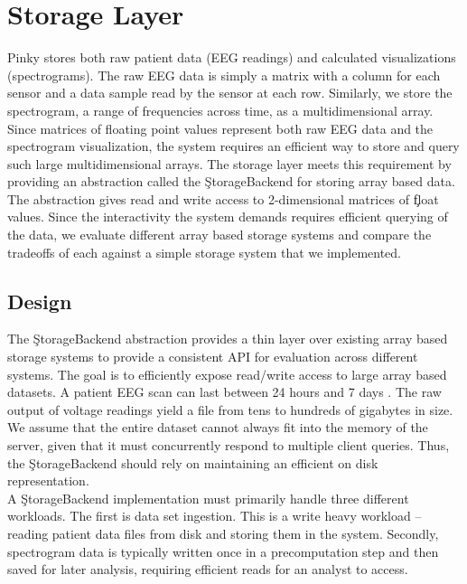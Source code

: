 \chapter{Storage Layer}\label{storage-ch}

Pinky stores both raw patient data (EEG readings) and calculated visualizations
(spectrograms). The raw EEG data is simply a matrix with a column for each
sensor and a data sample read by the sensor at each row. Similarly, we store
the spectrogram, a range of frequencies across time, as a multidimensional
array. Since matrices of floating point values represent both raw EEG data and
the spectrogram visualization, the system requires an efficient way to store
and query such large multidimensional arrays. The storage layer meets this
requirement by providing an abstraction called the \c{StorageBackend} for
storing array based data. The abstraction gives read and write access to
2-dimensional matrices of \c{float} values. Since the interactivity the system
demands requires efficient querying of the data, we evaluate different array
based storage systems and compare the tradeoffs of each against a simple
storage system that we implemented.


\section{Design}

The \c{StorageBackend} abstraction provides a thin layer over existing array
based storage systems to provide a consistent API for evaluation across
different systems. The goal is to efficiently expose read/write access to large
array based datasets. A patient EEG scan can last between 24 hours and 7 days
\cite{ceeg-3}. The raw output of voltage readings yield a file from tens to
hundreds of gigabytes in size. We assume that the entire dataset cannot always
fit into the memory of the server, given that it must concurrently respond to
multiple client queries. Thus, the \c{StorageBackend} should rely on
maintaining an efficient on disk representation. \\

A \c{StorageBackend} implementation must primarily handle three different
workloads. The first is data set ingestion. This is a write heavy workload --
reading patient data files from disk and storing them in the system. Secondly,
spectrogram data is typically written once in a precomputation step and then
saved for later analysis, requiring efficient reads for an analyst to access.

